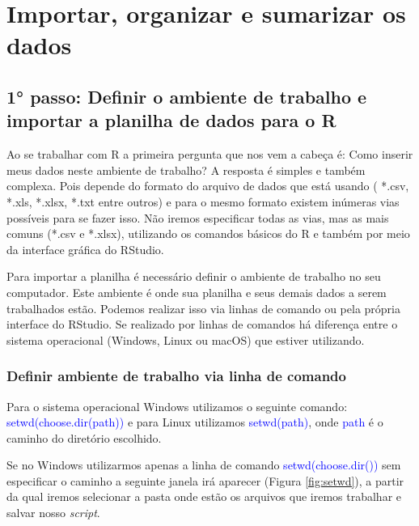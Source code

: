\documentclass[titlepage, oneside, openany, a4paper]{book}
\begin{document}
\hypertarget{importar-organizar-e-sumarizar-os-dados}{%
\chapter{Importar, organizar e sumarizar os dados}\label{importar-organizar-e-sumarizar-os-dados}}

\hypertarget{passo-definir-o-ambiente-de-trabalho-e-importar-a-planilha-de-dados-para-o-r}{%
\section{1° passo: Definir o ambiente de trabalho e importar a planilha de dados para o R}\label{passo-definir-o-ambiente-de-trabalho-e-importar-a-planilha-de-dados-para-o-r}}

Ao se trabalhar com R a primeira pergunta que nos vem a cabeça é: Como inserir meus dados neste ambiente de trabalho? A resposta é simples e também complexa. Pois depende do formato do arquivo de dados que está usando ( *.csv, *.xls, *.xlsx, *.txt entre outros) e para o mesmo formato existem inúmeras vias possíveis para se fazer isso. Não iremos especificar todas as vias, mas as mais comuns (*.csv e *.xlsx), utilizando os comandos básicos do R e também por meio da interface gráfica do RStudio.

Para importar a planilha é necessário definir o ambiente de trabalho no seu computador. Este ambiente é onde sua planilha e seus demais dados a serem trabalhados estão. Podemos realizar isso via linhas de comando ou pela própria interface do RStudio. Se realizado por linhas de comandos há diferença entre o sistema operacional (Windows, Linux ou macOS) que estiver utilizando.

\hypertarget{definir-ambiente-de-trabalho-via-linha-de-comando}{%
\subsection{Definir ambiente de trabalho via linha de comando}\label{definir-ambiente-de-trabalho-via-linha-de-comando}}

Para o sistema operacional Windows utilizamos o seguinte comando: \textcolor{blue}{setwd(choose.dir(path))} e para Linux utilizamos \textcolor{blue}{setwd(path)}, onde \textcolor{blue}{path} é o caminho do diretório escolhido.

Se no Windows utilizarmos apenas a linha de comando \textcolor{blue}{setwd(choose.dir())} sem especificar o caminho a seguinte janela irá aparecer (Figura \ref{fig:setwd}), a partir da qual iremos selecionar a pasta onde estão os arquivos que iremos trabalhar e salvar nosso \emph{script}.
\end{document}
